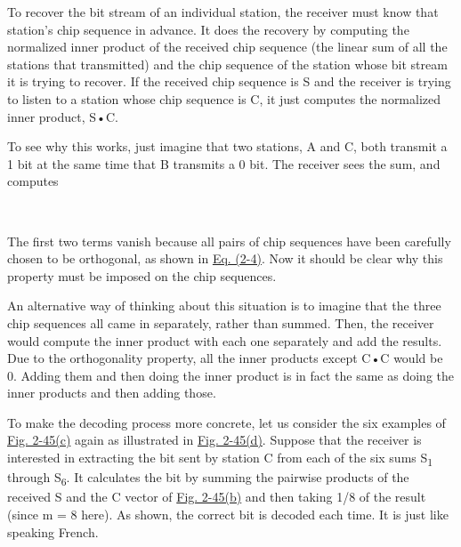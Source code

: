 \documentclass[b5paper,11pt]{memoir}
\begin{document}
To recover the bit stream of an individual station, the receiver must
know that station's chip sequence in advance. It does the recovery by
computing the normalized inner product of the received chip sequence
(the linear sum of all the stations that transmitted) and the chip
sequence of the station whose bit stream it is trying to recover. If the
received chip sequence is {S} and the receiver is trying to listen to a
station whose chip sequence is {C}, it just computes the normalized
inner product, {S}•{C}.

To see why this works, just imagine that two stations, {A} and {C}, both
transmit a 1 bit at the same time that {B} transmits a 0 bit. The
receiver sees the sum,
and computes


~

The first two terms vanish because all pairs of chip sequences have been
carefully chosen to be orthogonal, as shown in
\protect\hyperlink{0130661023_ch02lev1sec6.htmlux5cux23ch02eq04}{Eq.
(2-4)}. Now it should be clear why this property must be imposed on the
chip sequences.

An alternative way of thinking about this situation is to imagine that
the three chip sequences all came in separately, rather than summed.
Then, the receiver would compute the inner product with each one
separately and add the results. Due to the orthogonality property, all
the inner products except {C}•{C} would be 0. Adding them and then doing
the inner product is in fact the same as doing the inner products and
then adding those.

To make the decoding process more concrete, let us consider the six
examples of
\protect\hyperlink{0130661023_ch02lev1sec6.htmlux5cux23ch02fig45}{Fig.
2-45(c)} again as illustrated in
\protect\hyperlink{0130661023_ch02lev1sec6.htmlux5cux23ch02fig45}{Fig.
2-45(d)}. Suppose that the receiver is interested in extracting the bit
sent by station {C} from each of the six sums {S}\textsubscript{1}
through {S}\textsubscript{6}. It calculates the bit by summing the
pairwise products of the received {S} and the {C} vector of
\protect\hyperlink{0130661023_ch02lev1sec6.htmlux5cux23ch02fig45}{Fig.
2-45(b)} and then taking 1/8 of the result (since {m} = 8 here). As
shown, the correct bit is decoded each time. It is just like speaking
French.
\end{document}
